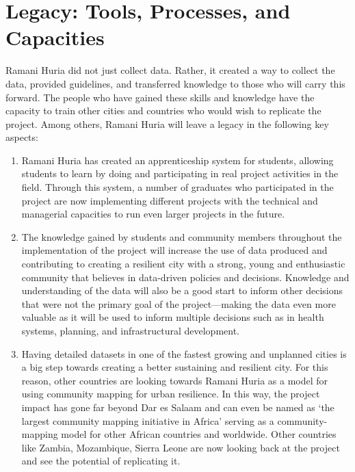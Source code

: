 \documentclass[a4paper,12pt,twoside]{article}
\begin{document}
\section{Legacy: Tools, Processes, and Capacities}
Ramani Huria did not just collect data. Rather, it created a way to collect the data, provided guidelines, and transferred knowledge to those who will carry this forward. The people who have gained these skills and knowledge have the capacity to train other cities and countries who would wish to replicate the project. Among others, Ramani Huria will leave a legacy in the following key aspects:
\begin{mdframed}[hidealllines=true,backgroundcolor=RHgreen!10,innerleftmargin=6pt,innerrightmargin=6pt,leftmargin=-3pt,rightmargin=-3pt]
\begin{enumerate}
    \item Ramani Huria has created an apprenticeship system for students, allowing students to learn by doing and participating in real project activities in the field. Through this system, a number of graduates who participated in the project are now implementing different projects with the technical and managerial capacities to run even larger projects in the future.
    \item The knowledge gained by students and community members throughout the implementation of the project will increase the use of data produced and contributing to creating a resilient city with a strong, young and enthusiastic community that believes in data-driven policies and decisions. Knowledge and understanding of the data will also be a good start to inform other decisions that were not the primary goal of the project---making the data even more valuable as it will be used to inform multiple decisions such as in health systems, planning, and infrastructural development.
    \item Having detailed datasets in one of the fastest growing and unplanned cities is a big step towards creating a better sustaining and resilient city. For this reason, other countries are looking towards Ramani Huria as a model for using community mapping for urban resilience. In this way, the project impact has gone far beyond Dar es Salaam and can even be named as  ‘the largest community mapping initiative in Africa’ serving as a community-mapping model for other African countries and worldwide. Other countries like Zambia, Mozambique, Sierra Leone are now looking back at the project and see the potential of replicating it.
\end{enumerate}
\end{mdframed}
\end{document}
